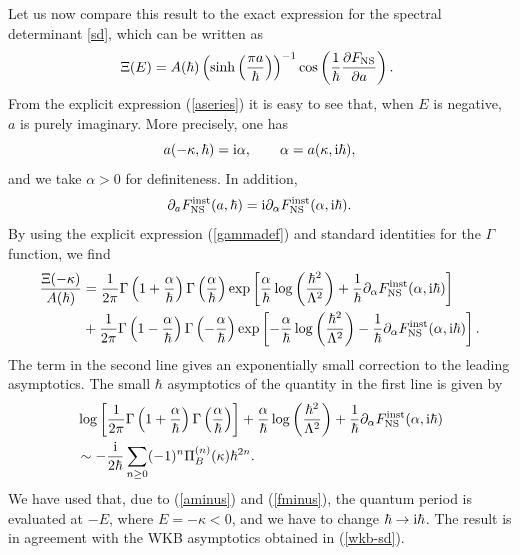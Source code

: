 \documentclass[a4paper,11pt]{article}
\theoremstyle{definition}
\newcommand{\ri}{{\rm i}}
\newcommand{\be}{\begin{equation}}
\newcommand{\ee}{\end{equation}}
\newcommand{\ba}{\begin{aligned}}
\newcommand{\ea}{\end{aligned}}
\begin{document}
 Let us now compare this result to the exact expression for the spectral determinant \eqref{sd}, which can be written as
 \be
 \label{alt-sd}
 \Xi(E)=A (\hbar) \left( \sinh\left(\frac{\pi a}{\hbar }\right) \right)^{-1} \cos\left( {1\over \hbar} {\partial F_{\rm NS} \over \partial a} \right).\
 \ee
From the explicit expression (\ref{aseries}) it is easy to see that,
when $E$ is negative, $a$ is purely imaginary. More precisely, one has
%
%
\be
\label{aminus}
a(-\kappa, \hbar)= \ri \alpha, \qquad \alpha= a(\kappa, \ri\hbar),  
\ee
%
and we take $\alpha>0$ for definiteness. In addition,
%
\be
\label{fminus}
\partial_a F^{\rm inst} _{\rm NS} (a, \hbar)= \ri \partial_\alpha F^{\rm inst}_{\rm NS} (\alpha, \ri\hbar).  
\ee
%
By using the explicit expression (\ref{gammadef}) and standard
identities for the $\Gamma$ function, we find
%
\be
\ba
{\Xi(-\kappa)\over A(\hbar)}&={1\over 2 \pi} \Gamma\left( 1+{\alpha \over \hbar} \right)  \Gamma\left( {\alpha \over \hbar} \right) \exp \left[ {\alpha \over \hbar} \log\left( {\hbar^2 \over \Lambda^2} \right) + {1\over \hbar} \partial_\alpha F^{\rm inst}_{\rm NS} (\alpha, \ri\hbar) \right]
\\& +{1\over 2 \pi} \Gamma\left(1-{\alpha \over \hbar} \right)  \Gamma\left(-{\alpha \over \hbar} \right) \exp \left[ -{\alpha \over \hbar} \log\left( {\hbar^2 \over \Lambda^2} \right) - {1\over \hbar} \partial_\alpha F^{\rm inst}_{\rm NS} (\alpha, \ri\hbar) \right]. 
\ea
\ee
%
The term in the second line gives an exponentially small correction to
the leading asymptotics. The small $\hbar$ asymptotics of the quantity
in the first line is given by 
%
\be
\ba
&\log \left[ {1\over 2 \pi} \Gamma\left( 1+{\alpha \over \hbar} \right)  \Gamma\left( {\alpha \over \hbar} \right) \right]+ {\alpha \over \hbar} \log\left( {\hbar^2 \over \Lambda^2} \right) + {1\over \hbar} \partial_\alpha F^{\rm inst}_{\rm NS} (\alpha, \ri\hbar) 
\\&\sim  -{\ri \over 2 \hbar} \sum_{n \ge 0} (-1)^n \Pi_B ^{(n)}(\kappa) \hbar^{2n}.  
\ea
\ee
%
We have used that, due to (\ref{aminus}) and (\ref{fminus}), the
quantum period is evaluated at $-E$, where $E=-\kappa<0$, and we have
to change  $\hbar\rightarrow \ri\hbar$. The result is in agreement with
the WKB asymptotics obtained in (\ref{wkb-sd}).
\end{document}
